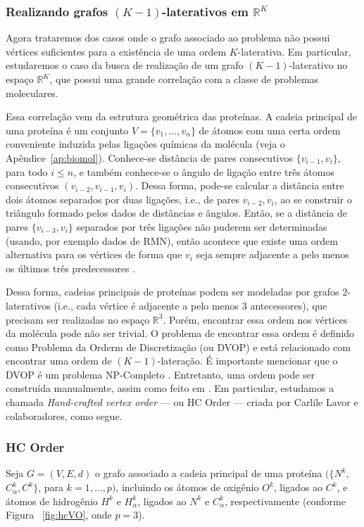 \subsubsection{Realizando grafos $(K-1)$-laterativos em $\mathbb{R}^K$}

Agora trataremos dos casos onde o grafo associado ao problema não possui vértices suficientes para a existência de uma ordem $K$-laterativa. Em particular, estudaremos o caso da busca de realização de um grafo $(K-1)$-laterativo no espaço $\mathbb{R}^K$, que possui uma grande correlação com a classe de problemas moleculares.

Essa correlação vem da estrutura geométrica das proteínas. A cadeia principal de uma proteína é um conjunto $V = \{v_1,\dots,v_n\}$ de átomos com uma certa ordem conveniente induzida pelas ligações químicas da molécula (veja o Apêndice~\ref{ap:biomol}). Conhece-se distância de pares consecutivos $\{v_{i-1},v_i\}$, para todo $i\leq n$, e também conhece-se o ângulo de ligação entre três átomos consecutivos $(v_{i-2},v_{i-1}, v_i)$. Dessa forma, pode-se calcular a distância entre dois átomos separados por duas ligações, i.e., de pares ${v_{i-2},v_i}$, ao se construir o triângulo formado pelos dados de distâncias e ângulos. Então, se a distância de pares $\{v_{i-3},v_i\}$ separados por três ligações não puderem ser determinadas (usando, por exemplo dados de RMN), então acontece que existe uma ordem alternativa para os vértices de forma que $v_i$ seja sempre adjacente a pelo menos os últimos três predecessores \cite{libertiEDG}.

Dessa forma, cadeias principais de proteínas podem ser modeladas por grafos $2$-laterativos (i.e., cada vértice é adjacente a pelo menos 3 antecessores), que precisam ser realizadas no espaço $\mathbb{R}^3$. Porém, encontrar essa ordem nos vértices da molécula pode não ser trivial. O problema de encontrar essa ordem é definido como Problema da Orderm de Discretização (ou DVOP) e está relacionado com encontrar uma ordem de $(K-1)$-lateração. É importante mencionar que o DVOP é um problema NP-Completo \cite{carlile:dvopComplexity}. Entretanto, uma ordem pode ser construída manualmente, assim como feito em \cite{carlile:MinimalOrder,douglasSideChainOrder}. Em particular, estudamos a chamada \textit{Hand-crafted vertex order} --- ou HC Order --- criada por Carlile Lavor e colaboradores, como segue.

\subsubsection*{HC Order}
Seja $G = (V, E, d)$ o grafo associado a cadeia principal de uma proteína $(\{N^k,\ $ $ C^{k}_\alpha,C^k\}$, para $k = 1,\dots,p)$, incluindo os átomos de oxigênio $O^k$, ligados ao $C^k$, e átomos de hidrogênio $H^k$ e $H^{k}_\alpha$, ligados ao $N^k$ e $C^{k}_\alpha$, respectivamente (conforme Figura ~\ref{fig:hcVO}, onde $p = 3$).


